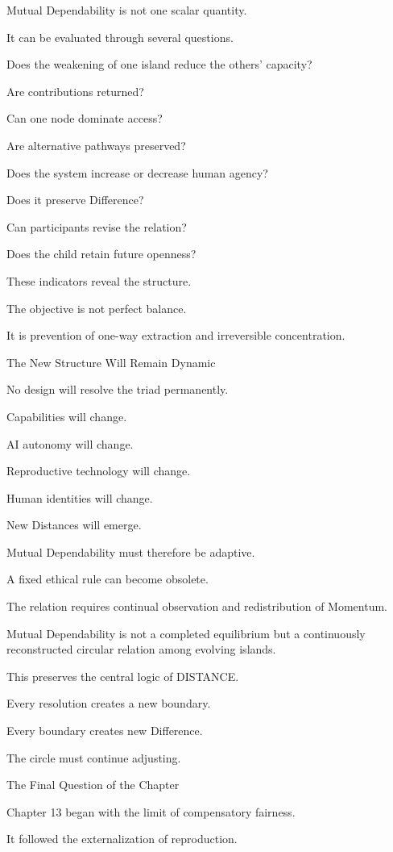 Mutual Dependability is not one scalar quantity.

It can be evaluated through several questions.

Does the weakening of one island reduce the others’ capacity?

Are contributions returned?

Can one node dominate access?

Are alternative pathways preserved?

Does the system increase or decrease human agency?

Does it preserve Difference?

Can participants revise the relation?

Does the child retain future openness?

These indicators reveal the structure.

The objective is not perfect balance.

It is prevention of one-way extraction and irreversible concentration.

The New Structure Will Remain Dynamic

No design will resolve the triad permanently.

Capabilities will change.

AI autonomy will change.

Reproductive technology will change.

Human identities will change.

New Distances will emerge.

Mutual Dependability must therefore be adaptive.

A fixed ethical rule can become obsolete.

The relation requires continual observation and redistribution of Momentum.

Mutual Dependability is not a completed equilibrium but a continuously reconstructed circular relation among evolving islands.

This preserves the central logic of DISTANCE.

Every resolution creates a new boundary.

Every boundary creates new Difference.

The circle must continue adjusting.

The Final Question of the Chapter

Chapter 13 began with the limit of compensatory fairness.

It followed the externalization of reproduction.

